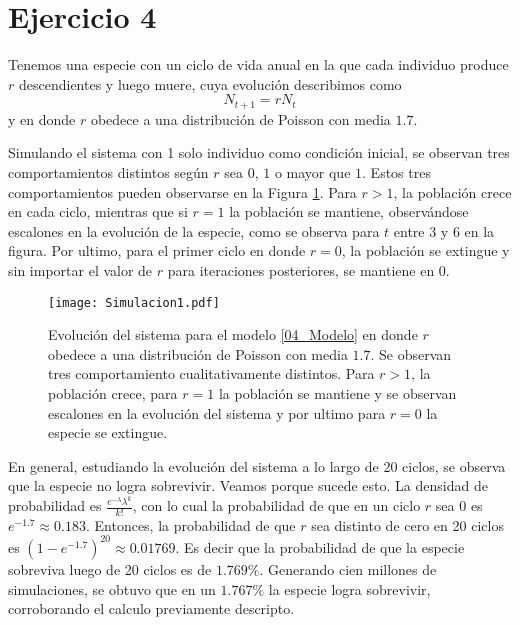 \section*{Ejercicio 4}
\graphicspath{{Figuras/ej_04/}}

Tenemos una especie con un ciclo de vida anual en la que cada individuo produce $r$ descendientes y luego muere, cuya evolución describimos como
\begin{equation}
    N_{t+1} = r N_{t}
    \label{04_Modelo}
\end{equation}
y en donde $r$ obedece a una distribución de Poisson con media $1.7$.

Simulando el sistema con 1 solo individuo como condición inicial, se observan tres comportamientos distintos según $r$ sea $0$, $1$ o mayor que $1$. Estos tres comportamientos pueden observarse en la Figura \ref{04_Simulacion}. Para $r>1$, la población crece en cada ciclo, mientras que si $r=1$ la población se mantiene, observándose escalones en la evolución de la especie, como se observa para $t$ entre 3 y 6 en la figura. Por ultimo, para el primer ciclo en donde $r=0$, la población se extingue y sin importar el valor de $r$ para iteraciones posteriores, se mantiene en $0$. 

\begin{figure}[h!]
    \centering
    \texttt{[image: Simulacion1.pdf]}
    \caption{Evolución del sistema para el modelo \ref{04_Modelo} en donde $r$ obedece a una distribución de Poisson con media $1.7$. Se observan tres comportamiento cualitativamente distintos. Para $r>1$, la población crece, para $r=1$ la población se mantiene y se observan escalones en la evolución del sistema y por ultimo para $r=0$ la especie se extingue.}
    \label{04_Simulacion}
\end{figure}

En general, estudiando la evolución del sistema a lo largo de 20 ciclos, se observa que la especie no logra sobrevivir. Veamos porque sucede esto. La densidad de probabilidad es $\frac{e^{-\lambda}\lambda^{k}}{k!}$, con lo cual la probabilidad de que en un ciclo $r$ sea $0$ es $e^{-1.7}\approx0.183$. Entonces, la probabilidad de que $r$ sea distinto de cero en 20 ciclos es $(1-e^{-1.7})^{20}\approx0.01769$. Es decir que la probabilidad de que la especie sobreviva luego de 20 ciclos es de $1.769\%$. Generando cien millones de simulaciones, se obtuvo que en un $1.767\%$ la especie logra sobrevivir, corroborando el calculo previamente descripto. 